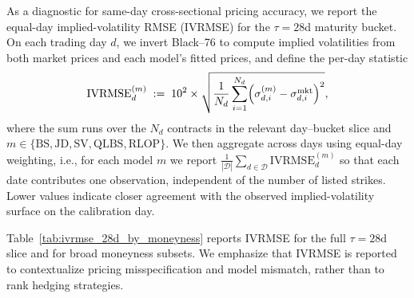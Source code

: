 As a diagnostic for same-day cross-sectional pricing accuracy, we report the equal-day implied-volatility RMSE (IVRMSE) for the $\tau=28$d maturity bucket.
On each trading day $d$, we invert Black--76 \cite{black1976commodity} to compute implied volatilities from both market prices and each model’s fitted prices, and define the per-day statistic
\begin{align}
\mathrm{IVRMSE}^{(m)}_{d}
\;:=\;
10^{2}\times
\sqrt{\frac{1}{N_d}\sum_{i=1}^{N_d}\Bigl(\sigma^{(m)}_{d,i}-\sigma^{\mathrm{mkt}}_{d,i}\Bigr)^2},
\label{eq:ivrmse_def}
\end{align}
where the sum runs over the $N_d$ contracts in the relevant day--bucket slice and $m\in\{\mathrm{BS},\mathrm{JD},\mathrm{SV},\mathrm{QLBS},\mathrm{RLOP}\}$.
We then aggregate across days using equal-day weighting, i.e., for each model $m$ we report
$\frac{1}{|\mathcal{D}|}\sum_{d\in\mathcal{D}}\mathrm{IVRMSE}^{(m)}_{d}$ so that each date contributes one observation, independent of the number of listed strikes.
Lower values indicate closer agreement with the observed implied-volatility surface on the calibration day.

Table~\ref{tab:ivrmse_28d_by_moneyness} reports IVRMSE for the full $\tau=28$d slice and for broad moneyness subsets.
We emphasize that IVRMSE is reported to contextualize pricing misspecification and model mismatch, rather than to rank hedging strategies.

